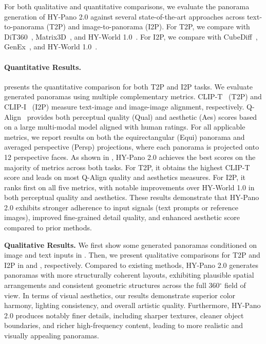\documentclass{article} %
\begin{document}
For both qualitative and quantitative comparisons, we evaluate the panorama generation of HY-Pano 2.0 against several state-of-the-art approaches across text-to-panorama (T2P) and image-to-panorama (I2P). 
For T2P, we compare with DiT360~\cite{feng2025dit360}, Matrix3D~\cite{yang2025matrix}, and HY-World 1.0~\cite{hunyuanworld2025tencent}. 
For I2P, we compare with CubeDiff~\cite{kalischek2025cubediff}, GenEx~\cite{lu2024genex}, and HY-World 1.0~\cite{hunyuanworld2025tencent}.



\paragraph{Quantitative Results.}
 presents the quantitative comparison for both T2P and I2P tasks.
We evaluate generated panoramas using multiple complementary metrics. CLIP-T~\cite{radford2021learning} (T2P) and CLIP-I~\cite{radford2021learning} (I2P) measure text-image and image-image alignment, respectively. Q-Align~\cite{wu2023qalign} provides both perceptual quality (Qual) and aesthetic (Aes) scores based on a large multi-modal model aligned with human ratings. For all applicable metrics, we report results on both the equirectangular (Equi) panorama and averaged perspective (Persp) projections, where each panorama is projected onto 12 perspective faces.
As shown in , HY-Pano 2.0 achieves the best scores on the majority of metrics across both tasks. For T2P, it obtains the highest CLIP-T score and leads on most Q-Align quality and aesthetics measures. For I2P, it ranks first on all five metrics, with notable improvements over HY-World 1.0 in both perceptual quality and aesthetics. These results demonstrate that HY-Pano 2.0 exhibits stronger adherence to input signals (text prompts or reference images), improved fine-grained detail quality, and enhanced aesthetic score compared to prior methods.

\noindent\textbf{Qualitative Results.}
We first show some generated panoramas conditioned on image and text inputs in .
Then, we present qualitative comparisons for T2P and I2P in  and , respectively. 
Compared to existing methods, HY-Pano 2.0 generates panoramas with more structurally coherent layouts, exhibiting plausible spatial arrangements and consistent geometric structures across the full 360$^\circ$ field of view. In terms of visual aesthetics, our results demonstrate superior color harmony, lighting consistency, and overall artistic quality. Furthermore, HY-Pano 2.0 produces notably finer details, including sharper textures, cleaner object boundaries, and richer high-frequency content, leading to more realistic and visually appealing panoramas.
\end{document}
